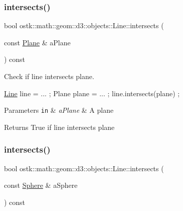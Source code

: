 \subsubsection{\texorpdfstring{intersects()}{intersects()}\hspace{0.1cm}{\footnotesize\ttfamily [2/4]}}
{\footnotesize\ttfamily bool ostk\+::math\+::geom\+::d3\+::objects\+::\+Line\+::intersects (\begin{DoxyParamCaption}\item[{const \hyperlink{classostk_1_1math_1_1geom_1_1d3_1_1objects_1_1_plane}{Plane} \&}]{a\+Plane }\end{DoxyParamCaption}) const}



Check if line intersects plane. 


\begin{DoxyCode}
\hyperlink{classostk_1_1math_1_1geom_1_1d3_1_1objects_1_1_line_a9ebdaaf67a4bd91780808f8683463ebe}{Line} line = ... ;
Plane plane = ... ;
line.intersects(plane) ;
\end{DoxyCode}



\begin{DoxyParams}[1]{Parameters}
\mbox{\tt in}  & {\em a\+Plane} & A plane \\
\hline
\end{DoxyParams}
\begin{DoxyReturn}{Returns}
True if line intersects plane 
\end{DoxyReturn}
\mbox{\label{classostk_1_1math_1_1geom_1_1d3_1_1objects_1_1_line_a5300ab7d6cbe87cf74de014252956558}} 
\subsubsection{\texorpdfstring{intersects()}{intersects()}\hspace{0.1cm}{\footnotesize\ttfamily [3/4]}}
{\footnotesize\ttfamily bool ostk\+::math\+::geom\+::d3\+::objects\+::\+Line\+::intersects (\begin{DoxyParamCaption}\item[{const \hyperlink{classostk_1_1math_1_1geom_1_1d3_1_1objects_1_1_sphere}{Sphere} \&}]{a\+Sphere }\end{DoxyParamCaption}) const}



